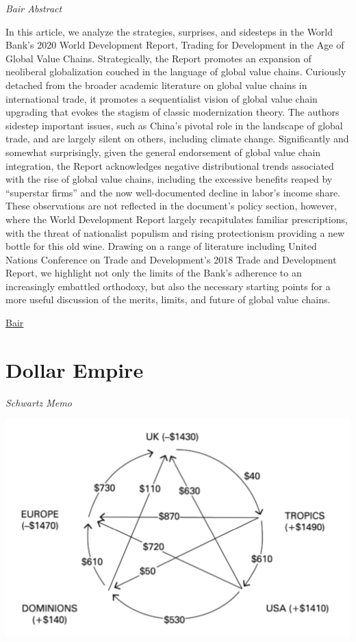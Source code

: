 \documentclass[
]{book}
\begin{document}
\emph{Bair Abstract}

In this article, we analyze the strategies, surprises, and sidesteps in the World Bank's 2020 World Development Report, Trading for Development in the Age of Global Value Chains. Strategically, the Report promotes an expansion of neoliberal globalization couched in the language of global value chains. Curiously detached from the broader academic literature on global value chains in international trade, it promotes a sequentialist vision of global value chain upgrading that evokes the stagism of classic modernization theory. The authors sidestep important issues, such as China's pivotal role in the landscape of global trade, and are largely silent on others, including climate change. Significantly and somewhat surprisingly, given the general endorsement of global value chain integration, the Report acknowledges negative distributional trends associated with the rise of global value chains, including the excessive benefits reaped by ``superstar firms'' and the now well-documented decline in labor's income share. These observations are not reflected in the document's policy section, however, where the World Development Report largely recapitulates familiar prescriptions, with the threat of nationalist populism and rising protectionism providing a new bottle for this old wine. Drawing on a range of literature including United Nations Conference on Trade and Development's 2018 Trade and Development Report, we highlight not only the limits of the Bank's adherence to an increasingly embattled orthodoxy, but also the necessary starting points for a more useful discussion of the merits, limits, and future of global value chains.

\href{https://journals.sagepub.com/doi/abs/10.1177/0308518X211006718}{Bair}

\hypertarget{dollar-empire}{%
\section{Dollar Empire}\label{dollar-empire}}

\emph{Schwartz Memo}

\includegraphics{fig/net-world-trade-surplusses-1928.png}
\end{document}
